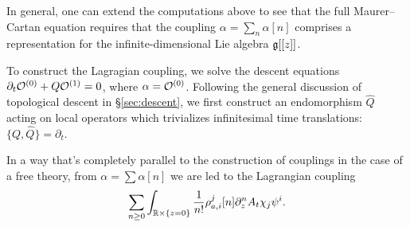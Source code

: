 \documentclass[11pt]{amsart}
\def\brian#1{{\textcolor{blue!65!red}{BRW: {#1}}}}
\def\natalie#1{{\textcolor{green!65!black}{NMP: {#1}}}}
\begin{document}
In general, one can extend the computations above to see that the full Maurer--Cartan equation requires that the coupling $\alpha = \sum_n \alpha[n]$ comprises a representation for the infinite-dimensional Lie algebra $\mathfrak g[[z]]$.  
%


To construct the Lagragian coupling, we solve the descent equations $\partial_t \mathcal O^{(0)} + Q \mathcal O^{(1)} = 0$, where $\alpha = \mathcal O^{(0)}$. 
Following the general discussion of topological descent in \S \ref{sec:descent}, we first construct an endomorphism $\hat{Q}$ acting on local operators which trivializes infinitesimal time translations: $\{Q, \hat{Q}\} = \partial_t$. 

%
%
%
In a way that's completely parallel to the construction of couplings in the case of a free theory, from $\alpha = \sum \alpha[n]$ we are led to the Lagrangian coupling
\[
\sum_{n \geq 0} \int_{\mathbb R \times \{z=0\}} \frac{1}{n!} \rho_{a,i}^j[n] \partial_z^n A_t \chi_j \psi^i .
\]
\end{document}
